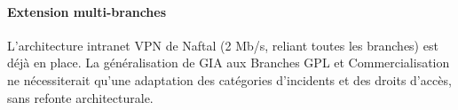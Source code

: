 \paragraph*{Extension multi-branches}
L'architecture intranet VPN de Naftal (2 Mb/s, reliant toutes les branches) est déjà en place. La
généralisation de GIA aux Branches GPL et Commercialisation ne nécessiterait qu'une adaptation des
catégories d'incidents et des droits d'accès, sans refonte architecturale.
